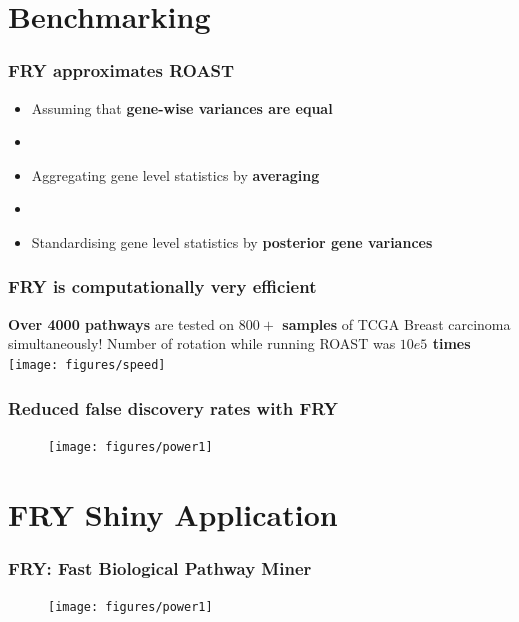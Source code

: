\documentclass[9pt,t]{beamer}
\begin{document}
\section{Benchmarking}
\begin{frame}
\frametitle{{\ttfamily FRY} approximates {\ttfamily ROAST}}
\vspace{2cm}
\begin{itemize}
\item Assuming that \textbf{\color{oxygenpurple}gene-wise variances are equal}
\item[]
\item Aggregating gene level statistics by \textbf{\color{oxygenpurple}averaging}
\item[] 
\item Standardising gene level statistics by \textbf{\color{oxygenpurple}posterior gene variances}
\end{itemize}
\end{frame}

\begin{frame}
\frametitle{{\ttfamily FRY} is computationally very efficient}
\vfill
\large\textbf{\color{oxygenpurple}Over 4000 pathways} are tested on \textbf{\color{oxygenpurple}$800+$ samples} of TCGA Breast carcinoma simultaneously! Number of rotation while running {\ttfamily ROAST} was \textbf{\color{oxygenpurple}$10e5$ times}\\
\vfill
\texttt{[image: figures/speed]}
\end{frame}

\begin{frame}
\frametitle{Reduced false discovery rates with {\ttfamily FRY}}
\begin{figure}
\texttt{[image: figures/power1]}
\end{figure}
\end{frame}

\section{{\ttfamily FRY} Shiny Application}
\begin{frame}
\frametitle{{\ttfamily FRY}: Fast Biological Pathway Miner}
\begin{figure}
\texttt{[image: figures/power1]}
\end{figure}
\end{frame}
\end{document}
